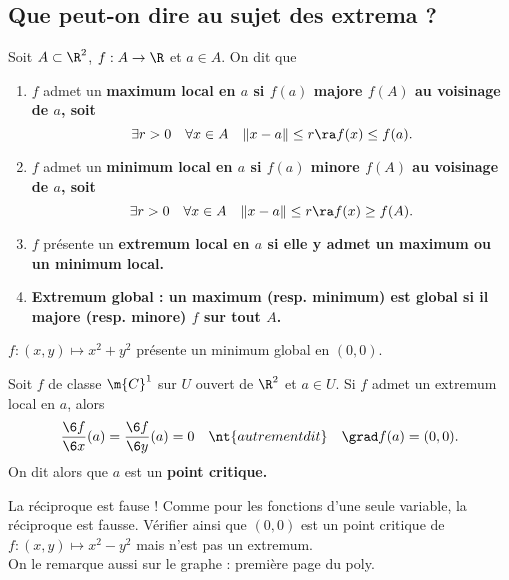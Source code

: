 \documentclass[11pt]{article}
\renewcommand*{\C}{\m{C}}
\begin{document}
\subsection{Que peut-on dire au sujet des extrema ?}

\begin{defi}{}{}
    Soit $A\subset \R^2$, $f:A\to\R$ et $a\in A$. On dit que
    \begin{enumerate}[topsep=0pt,itemsep=-0.9 ex]
        \item $f$ admet un \bf{maximum local} en $a$ si $f(a)$ majore $f(A)$ au voisinage de $a$, soit
        \begin{equation*}
            \exists r>0\quad\forall x\in A\quad\|x-a\|\leq r \ra f(x)\leq f(a).
        \end{equation*}
        \item $f$ admet un \bf{minimum local} en $a$ si $f(a)$ minore $f(A)$ au voisinage de $a$, soit
        \begin{equation*}
            \exists r>0 \quad \forall x \in A \quad \|x-a\|\leq r \ra f(x) \geq f(A).
        \end{equation*}
        \item $f$ présente un \bf{extremum local} en $a$ si elle y admet un maximum ou un minimum local.
        \item \bf{Extremum global} : un maximum (resp. minimum) est global si il majore (resp. minore) $f$ sur tout $A$.  
    \end{enumerate}
\end{defi}

\begin{ex}{}{}
    $f:(x,y)\mapsto x^2 + y^2$ présente un minimum global en $(0,0)$.
\end{ex}

\begin{prop}{}{}
    Soit $f$ de classe $\C^1$ sur $U$ ouvert de $\R^2$ et $a\in U$.\n
    Si $f$ admet un extremum local en $a$, alors
    \begin{equation*}
        \frac{\6 f}{\6 x}(a) = \frac{\6 f}{\6 y}(a) = 0 \quad \nt{autrement dit} \quad \grad f(a)=(0,0).
    \end{equation*}
    On dit alors que $a$ est un \bf{point critique}.
\end{prop}

\begin{ex}{La réciproque est fause !}{}
    Comme pour les fonctions d'une seule variable, la réciproque est fausse.\n
    Vérifier ainsi que $(0,0)$ est un point critique de $f:(x,y)\mapsto x^2-y^2$ mais n'est pas un extremum.\\
    On le remarque aussi sur le graphe : première page du poly.
\end{ex}
\end{document}
